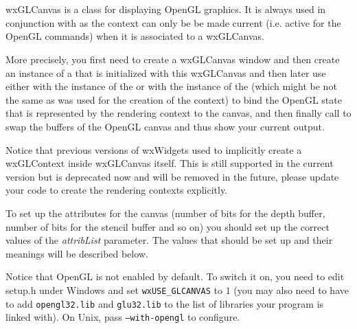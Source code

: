 \section{}\label{wxglcanvas}

wxGLCanvas is a class for displaying OpenGL graphics. It is always used in
conjunction with  as the context can only be
be made current (i.e. active for the OpenGL commands) when it is associated to
a wxGLCanvas.

More precisely, you first need to create a wxGLCanvas window and then create an
instance of a  that is initialized with this
wxGLCanvas and then later use either  
with the instance of the  or 
 with the instance of
the  (which might be not the same as was used
for the creation of the context) to bind the OpenGL state that is represented
by the rendering context to the canvas, and then finally call 
 to swap the buffers of
the OpenGL canvas and thus show your current output.

Notice that previous versions of wxWidgets used to implicitly create a
wxGLContext inside wxGLCanvas itself. This is still supported in the current
version but is deprecated now and will be removed in the future, please update
your code to create the rendering contexts explicitly.

To set up the attributes for the canvas (number of bits for the depth buffer,
number of bits for the stencil buffer and so on) you should set up the correct values of
the {\it attribList} parameter. The values that should be set up and their meanings will be described below.

Notice that OpenGL is not enabled by default. To switch it on, you need to edit
setup.h under Windows and set {\tt wxUSE\_GLCANVAS} to $1$ (you may also need
to have to add {\tt opengl32.lib} and {\tt glu32.lib} to the list of libraries
your program is linked with). On Unix, pass {\tt --with-opengl} to configure.


\\
\\

